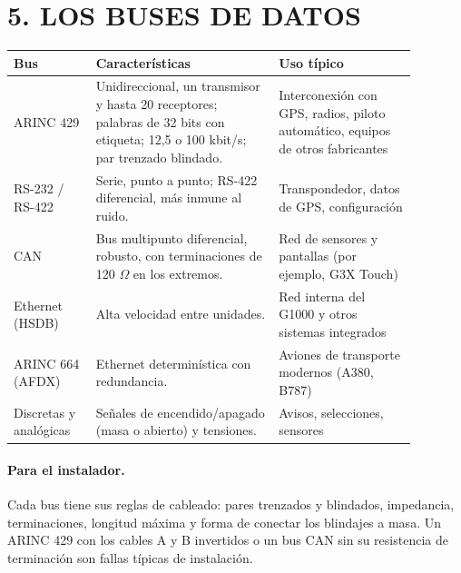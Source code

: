 \section*{5. LOS BUSES DE DATOS}

\begin{center}
\small
\begin{tabular}{|p{0.18\linewidth}|p{0.40\linewidth}|p{0.30\linewidth}|}
\hline
\textbf{Bus} & \textbf{Características} & \textbf{Uso típico} \\ \hline
ARINC 429 & Unidireccional, un transmisor y hasta 20 receptores; palabras de 32 bits con etiqueta;
12,5 o 100 kbit/s; par trenzado blindado. & Interconexión con GPS, radios, piloto automático,
equipos de otros fabricantes \\ \hline
RS-232 / RS-422 & Serie, punto a punto; RS-422 diferencial, más inmune al ruido. & Transpondedor,
datos de GPS, configuración \\ \hline
CAN & Bus multipunto diferencial, robusto, con terminaciones de 120 $\Omega$ en los extremos. &
Red de sensores y pantallas (por ejemplo, G3X Touch) \\ \hline
Ethernet (HSDB) & Alta velocidad entre unidades. & Red interna del G1000 y otros sistemas
integrados \\ \hline
ARINC 664 (AFDX) & Ethernet determinística con redundancia. & Aviones de transporte modernos
(A380, B787) \\ \hline
Discretas y analógicas & Señales de encendido/apagado (masa o abierto) y tensiones. & Avisos,
selecciones, sensores \\ \hline
\end{tabular}
\end{center}

\paragraph*{Para el instalador.} Cada bus tiene sus reglas de cableado: pares trenzados y
blindados, impedancia, terminaciones, longitud máxima y forma de conectar los blindajes a masa.
Un ARINC 429 con los cables A y B invertidos o un bus CAN sin su resistencia de terminación son
fallas típicas de instalación.


